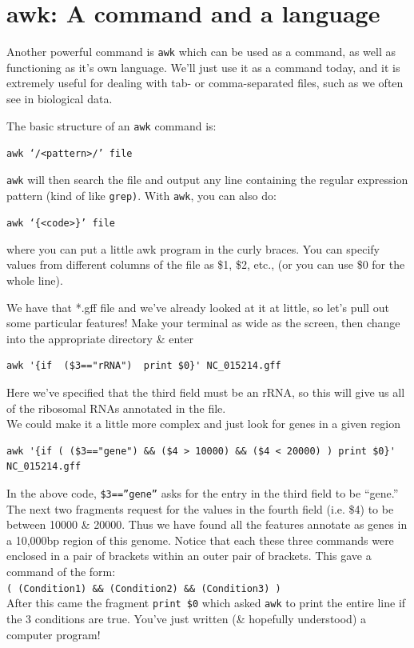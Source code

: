 \documentclass[a4paper,12pt,twoside]{memoir}
\begin{document}
\section{awk: A command and a language}
Another powerful command is \texttt{awk} which can be used as a command, as well as functioning as it's own language.
We'll just use it as a command today, and it is extremely useful for dealing with tab- or comma-separated files, such as we often see in biological data.
\begin{information}
The basic structure of an \texttt{awk} command is: 
\begin{center}
\texttt{awk `/<pattern>/' file} 
\end{center}
\texttt{awk} will then search the file and output any line containing the regular expression pattern (kind of like \texttt{grep)}.
With \texttt{awk}, you can also do: 
\begin{center}
\texttt{awk `\{<code>\}' file} 
\end{center}
where you can put a little awk program in the curly braces. 
You can specify values from different columns of the file as \$1, \$2, etc., (or you can use \$0 for the whole line).
\end{information}

\begin{steps}
We have that *.gff file and we've already looked at it at little, so let's pull out some particular features!
Make your terminal as wide as the screen, then change into the appropriate directory \& enter
\begin{lstlisting}
awk '{if  ($3=="rRNA")  print $0}' NC_015214.gff
\end{lstlisting}
Here we've specified that the third field must be an rRNA, so this will give us all of the ribosomal RNAs annotated in the file. \\

We could make it a little more complex and just look for genes in a given region
\begin{lstlisting}
awk '{if ( ($3=="gene") && ($4 > 10000) && ($4 < 20000) ) print $0}' NC_015214.gff
\end{lstlisting}
\end{steps}
\begin{note}
In the above code, \texttt{\$3==''gene''} asks for the entry in the third field to be ``gene.''
The next two fragments request for the values in the fourth field (i.e. \$4) to be between 10000 \& 20000.
Thus we have found all the features annotate as genes in a 10,000bp region of this genome.
Notice that each these three commands were enclosed in a pair of brackets within an outer pair of brackets.
This gave a command of the form: \\
\texttt{( (Condition1) \&\& (Condition2) \&\& (Condition3) )} \\
After this came the fragment \texttt{print \$0} which asked \texttt{awk} to print the entire line if the 3 conditions are true.
You've just written (\& hopefully understood) a computer program!
\end{note}
\end{document}
